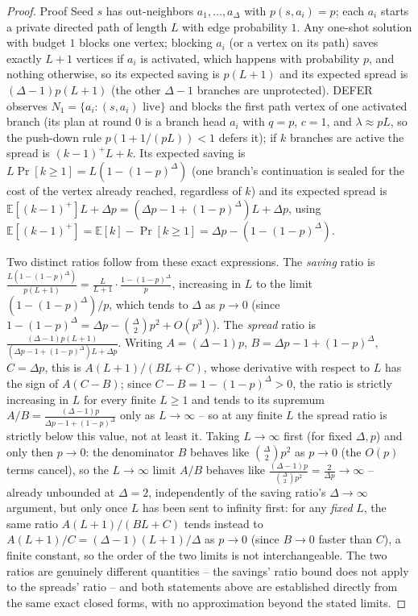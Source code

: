 \documentclass[ijoc,sglanonrev]{informs4}
\begin{document}
\begin{proof}{Proof}
Seed $s$ has out-neighbors $a_1,\dots,a_\Delta$ with $p(s,a_i)=p$; each
$a_i$ starts a private directed path of length $L$ with edge probability
$1$. Any one-shot solution with budget $1$ blocks one vertex; blocking
$a_i$ (or a vertex on its path) saves exactly $L+1$ vertices if $a_i$ is
activated, which happens with probability $p$, and nothing otherwise, so
its expected saving is $p(L+1)$ and its expected spread is
$(\Delta-1)p(L+1)$ (the other $\Delta-1$ branches are unprotected). DEFER
observes $N_1=\{a_i:(s,a_i)\text{ live}\}$ and blocks the first path vertex
of one activated branch (its plan at round $0$ is a branch head $a_i$ with
$q=p$, $c=1$, and $\lambda\approx pL$, so the push-down rule
$p(1+1/(pL))<1$ defers it); if $k$ branches are active the spread is
$(k-1)^+L+k$. Its expected saving is $L\Pr[k\ge1]=L(1-(1-p)^\Delta)$ (one
branch's continuation is sealed for the cost of the vertex already reached,
regardless of $k$) and its expected spread is
$\mathbb E[(k-1)^+]L+\Delta p=(\Delta p-1+(1-p)^\Delta)L+\Delta p$, using
$\mathbb E[(k-1)^+]=\mathbb E[k]-\Pr[k\ge1]=\Delta p-(1-(1-p)^\Delta)$.

Two distinct ratios follow from these exact expressions. The \emph{saving}
ratio is $\frac{L(1-(1-p)^\Delta)}{p(L+1)}=\frac{L}{L+1}\cdot
\frac{1-(1-p)^\Delta}{p}$, increasing in $L$ to the limit
$(1-(1-p)^\Delta)/p$, which tends to $\Delta$ as $p\to0$ (since
$1-(1-p)^\Delta=\Delta p-\binom\Delta2p^2+O(p^3)$). The \emph{spread} ratio
is $\frac{(\Delta-1)p(L+1)}{(\Delta p-1+(1-p)^\Delta)L+\Delta p}$. Writing
$A=(\Delta-1)p$, $B=\Delta p-1+(1-p)^\Delta$, $C=\Delta p$, this is
$A(L+1)/(BL+C)$, whose derivative with respect to $L$ has the sign of
$A(C-B)$; since $C-B=1-(1-p)^\Delta>0$, the ratio is strictly increasing in
$L$ for every finite $L\ge1$ and tends to its supremum $A/B=\frac{(\Delta-1)p}
{\Delta p-1+(1-p)^\Delta}$ only as $L\to\infty$ -- so at any finite $L$ the
spread ratio is strictly below this value, not at least it. Taking
$L\to\infty$ first (for fixed $\Delta,p$) and only then $p\to0$: the
denominator $B$ behaves like $\binom\Delta2p^2$ as $p\to0$ (the $O(p)$
terms cancel), so the $L\to\infty$ limit $A/B$ behaves like
$\frac{(\Delta-1)p}{\binom\Delta2p^2}=\frac{2}{\Delta p}\to\infty$ --
already unbounded at $\Delta=2$, independently of the saving ratio's
$\Delta\to\infty$ argument, but only once $L$ has been sent to infinity
first: for any \emph{fixed} $L$, the same ratio $A(L+1)/(BL+C)$ tends
instead to $A(L+1)/C=(\Delta-1)(L+1)/\Delta$ as $p\to0$ (since $B\to0$
faster than $C$), a finite constant, so the order of the two limits is not
interchangeable. The two ratios are genuinely different quantities -- the
savings' ratio bound does not apply to the spreads' ratio -- and both
statements above are established directly from the same exact closed
forms, with no approximation beyond the stated limits.\Halmos
\end{proof}
\end{document}
